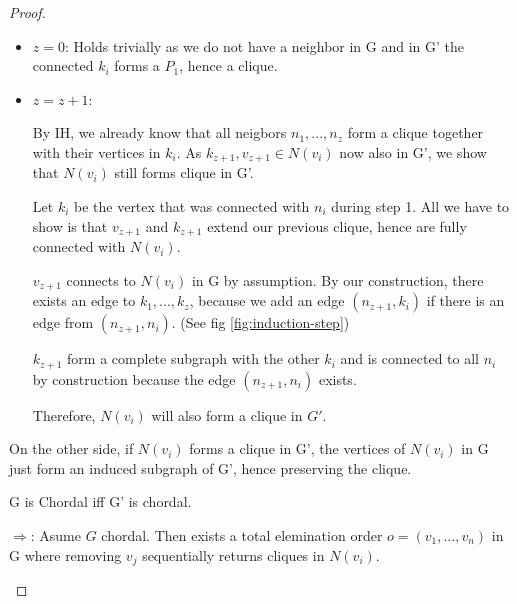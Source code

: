 \begin{proof}
\begin{subproof}
        \begin{itemize}
            \item $z = 0$: Holds trivially as we do not have a neighbor in G and in G' the connected $k_i$ forms a $P_1$, hence a clique.
            \item $z = z + 1$: 

            By IH, we already know that all neigbors $n_1,...,n_z$ form a clique together with their vertices in $k_{i}$. As $k_{z+1}, v_{z+1} \in N(v_i)$ now also in G', we show that $N(v_i)$ still forms clique in G'.

            Let $k_i$ be the vertex that was connected with $n_i$ during step 1. All we have to show is that $v_{z+1}$ and $k_{z+1}$ extend our previous clique, hence are fully connected with $N(v_i)$.
            
            $v_{z+1}$ connects to $N(v_i)$ in G by assumption. By our construction, there exists an edge to $k_1,...,k_z$, because we add an edge $(n_{z+1}, k_i)$ if there is an edge from $(n_{z+1}, n_i)$. (See fig \ref{fig:induction-step})

            $k_{z+1}$ form a complete subgraph with the other $k_i$ and is connected to all $n_i$ by construction because the edge $(n_{z+1},n_i)$ exists.  


            Therefore, $N(v_i)$ will also form a clique in $G'$.
        \end{itemize}

        On the other side, if $N(v_i)$ forms a clique in G', the vertices of $N(v_i)$ in G just form an induced subgraph of G', hence preserving the clique.
        
    \end{subproof}
   
    \begin{corollary}
    G is Chordal iff G' is chordal.    
    \end{corollary}
    \begin{subproof}
    $\Rightarrow$: Asume $G$ chordal. Then exists a total elemination order $o = (v_1, ..., v_n)$ in G where removing $v_j$ sequentially returns cliques in $N(v_i)$.


\end{subproof}
\end{proof}
